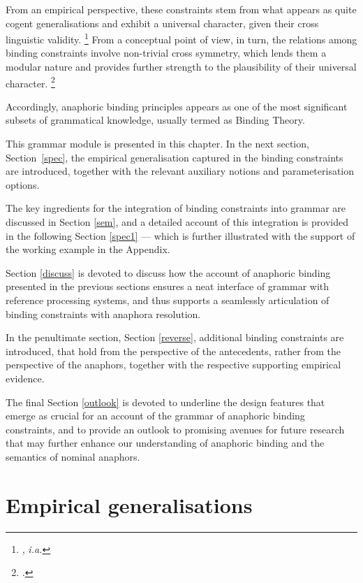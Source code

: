 \documentclass[output=paper
,modfonts
,nonflat]{langsci/langscibook}
\begin{document}
From an empirical perspective, these constraints stem
from what appears as quite cogent generalisations and exhibit a universal
character, given their cross linguistic validity.%
\footnote{
\citep{branco:livro00}, \em{i.a.}
}
From a conceptual point of view, in turn, the relations among binding
constraints involve non-trivial cross symmetry, which lends them a modular nature
and provides further strength to the plausibility of their universal character.%
 \footnote{
\citep{branco:2005}.
}

Accordingly, anaphoric binding principles appears as one of
the most significant subsets of grammatical knowledge, usually termed as Binding Theory.

This grammar module is presented in this chapter. In the next section, Section~\ref{spec},
the empirical generalisation captured in the binding constraints are introduced, together
with the relevant auxiliary notions and parameterisation options.

The key ingredients for the integration of binding constraints into grammar
are discussed in Section \ref{sem}, and a detailed account of this integration is provided
in the following Section \ref{spec1} --- which is further illustrated with the support of
the working example in the Appendix.

Section \ref{discuss} is devoted to discuss how
the account of anaphoric binding presented in the previous sections ensures a neat interface of grammar with reference processing
systems, and thus supports a seamlessly articulation of binding constraints
with anaphora resolution.

In the penultimate section, Section \ref{reverse}, additional binding constraints are introduced,
that hold from the perspective of the antecedents, rather from the perspective of the anaphors,
together with the respective supporting empirical evidence.

The final Section \ref{outlook} is devoted to underline the design features
that emerge as crucial for an account of the grammar of anaphoric
binding constraints, and to provide an outlook to promising avenues for future
research that may further enhance our understanding of anaphoric binding and the semantics
of nominal anaphors.


\section{Empirical generalisations \label{spec}}


\end{document}
